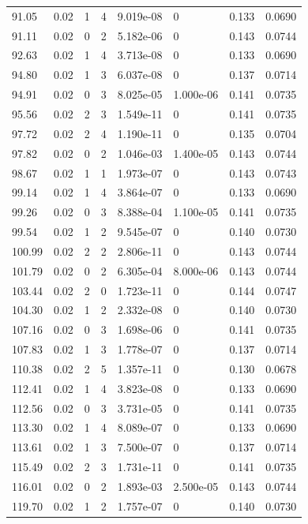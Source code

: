 \documentclass[preview]{standalone}
\begin{document}
{{{\begin{tabular}{L{1.2cm}C{1.2cm} C{0.3cm}C{0.5cm} C{1.4cm}C{1.4cm} C{1.4cm}C{1.4cm}}
  91.05  &  0.02  & 1     &  4 &  9.019e-08  & 0  & 0.133 &  0.0690   \\ 
  91.11  &  0.02  & 0     &  2 &  5.182e-06  & 0  & 0.143 &  0.0744   \\ 
  92.63  &  0.02  & 1     &  4 &  3.713e-08  & 0  & 0.133 &  0.0690   \\ 
  94.80  &  0.02  & 1     &  3 &  6.037e-08  & 0  & 0.137 &  0.0714   \\ 
  94.91  &  0.02  & 0     &  3 &  8.025e-05  & 1.000e-06  & 0.141 &  0.0735   \\ 
  95.56  &  0.02  & 2     &  3 &  1.549e-11  & 0  & 0.141 &  0.0735   \\ 
  97.72  &  0.02  & 2     &  4 &  1.190e-11  & 0  & 0.135 &  0.0704   \\ 
  97.82  &  0.02  & 0     &  2 &  1.046e-03  & 1.400e-05  & 0.143 &  0.0744   \\ 
  98.67  &  0.02  & 1     &  1 &  1.973e-07  & 0  & 0.143 &  0.0743   \\ 
  99.14  &  0.02  & 1     &  4 &  3.864e-07  & 0  & 0.133 &  0.0690   \\ 
  99.26  &  0.02  & 0     &  3 &  8.388e-04  & 1.100e-05  & 0.141 &  0.0735   \\ 
  99.54  &  0.02  & 1     &  2 &  9.545e-07  & 0  & 0.140 &  0.0730   \\ 
  100.99  &  0.02  & 2     &  2 &  2.806e-11  & 0  & 0.143 &  0.0744   \\ 
  101.79  &  0.02  & 0     &  2 &  6.305e-04  & 8.000e-06  & 0.143 &  0.0744   \\ 
  103.44  &  0.02  & 2     &  0 &  1.723e-11  & 0  & 0.144 &  0.0747   \\ 
  104.30  &  0.02  & 1     &  2 &  2.332e-08  & 0  & 0.140 &  0.0730   \\ 
  107.16  &  0.02  & 0     &  3 &  1.698e-06  & 0  & 0.141 &  0.0735   \\ 
  107.83  &  0.02  & 1     &  3 &  1.778e-07  & 0  & 0.137 &  0.0714   \\ 
  110.38  &  0.02  & 2     &  5 &  1.357e-11  & 0  & 0.130 &  0.0678   \\ 
  112.41  &  0.02  & 1     &  4 &  3.823e-08  & 0  & 0.133 &  0.0690   \\ 
  112.56  &  0.02  & 0     &  3 &  3.731e-05  & 0  & 0.141 &  0.0735   \\ 
  113.30  &  0.02  & 1     &  4 &  8.089e-07  & 0  & 0.133 &  0.0690   \\ 
  113.61  &  0.02  & 1     &  3 &  7.500e-07  & 0  & 0.137 &  0.0714   \\ 
  115.49  &  0.02  & 2     &  3 &  1.731e-11  & 0  & 0.141 &  0.0735   \\ 
  116.01  &  0.02  & 0     &  2 &  1.893e-03  & 2.500e-05  & 0.143 &  0.0744   \\ 
  119.70  &  0.02  & 1     &  2 &  1.757e-07  & 0  & 0.140 &  0.0730   \\ 
\hline 
\end{tabular} 

}}}
\end{document}
